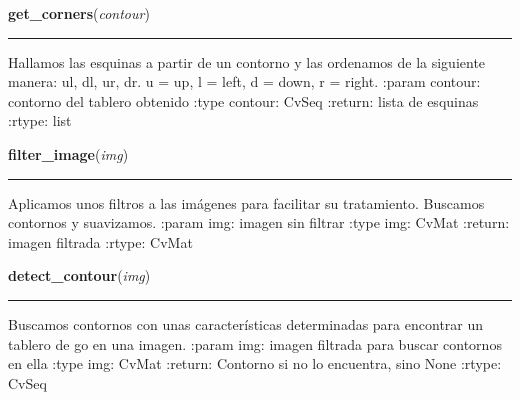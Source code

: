 \hspace{.8\funcindent}\begin{boxedminipage}{\funcwidth}

    \raggedright \textbf{get\_corners}(\textit{contour})

    \vspace{-1.5ex}

    \rule{\textwidth}{0.5\fboxrule}
\setlength{\parskip}{2ex}

Hallamos las esquinas a partir de un contorno y las ordenamos de la
siguiente manera: ul, dl, ur, dr.  u = up, l = left, d = down, r = right.
:param contour: contorno del tablero obtenido
:type contour: CvSeq
:return: lista de esquinas
:rtype: list
\setlength{\parskip}{1ex}
    \end{boxedminipage}

    \label{src:search_goban:filter_image}

    \vspace{0.5ex}

\hspace{.8\funcindent}\begin{boxedminipage}{\funcwidth}

    \raggedright \textbf{filter\_image}(\textit{img})

    \vspace{-1.5ex}

    \rule{\textwidth}{0.5\fboxrule}
\setlength{\parskip}{2ex}

Aplicamos unos filtros a las imágenes para facilitar su tratamiento.
Buscamos contornos y suavizamos.
:param img: imagen sin filtrar
:type img: CvMat
:return: imagen filtrada
:rtype: CvMat
\setlength{\parskip}{1ex}
    \end{boxedminipage}

    \label{src:search_goban:detect_contour}

    \vspace{0.5ex}

\hspace{.8\funcindent}\begin{boxedminipage}{\funcwidth}

    \raggedright \textbf{detect\_contour}(\textit{img})

    \vspace{-1.5ex}

    \rule{\textwidth}{0.5\fboxrule}
\setlength{\parskip}{2ex}

Buscamos contornos con unas características determinadas para encontrar
un tablero de go en una imagen.
:param img: imagen filtrada para buscar contornos en ella
:type img: CvMat
:return: Contorno si no lo encuentra, sino None
:rtype: CvSeq
\setlength{\parskip}{1ex}
    \end{boxedminipage}

